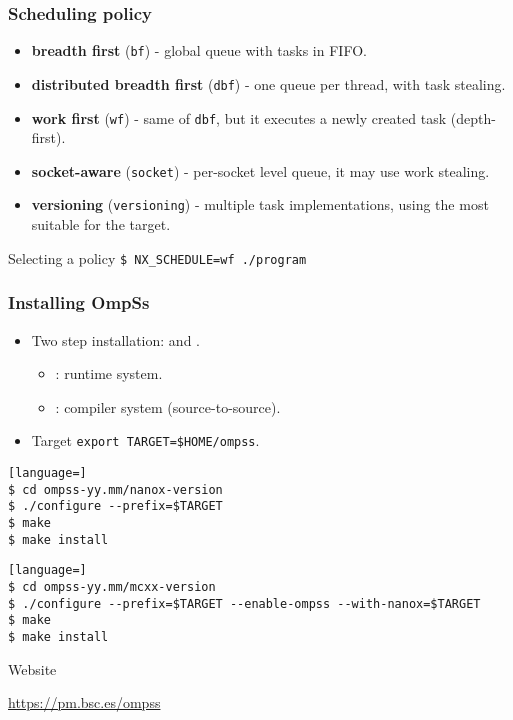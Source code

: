 \begin{frame}[fragile]
  \frametitle{Scheduling policy}
  \begin{itemize}
  \item {\bf breadth first} (\texttt{bf}) - global queue with tasks in FIFO.
  \item {\bf distributed breadth first} (\texttt{dbf}) - one queue per thread, with 
      task stealing.
  \item {\bf work first} (\texttt{wf}) - same of \texttt{dbf}, but it executes a 
    newly created task (depth-first).
  \item {\bf socket-aware} (\texttt{socket}) - per-socket level queue, it may use work stealing.
  \item {\bf versioning} (\texttt{versioning}) - multiple task implementations, using the 
    most suitable for the target.
  \end{itemize}
  \begin{exampleblock}{Selecting a policy}
  \verb+$ NX_SCHEDULE=wf ./program+
  \end{exampleblock}
\end{frame}
\begin{frame}[fragile]
  \frametitle{Installing OmpSs}
  \begin{itemize}
  \item Two step installation:  and .
    \begin{itemize}
    \item {}: runtime system.
    \item {}: compiler system (source-to-source).
    \end{itemize}
  \item Target \verb+export TARGET=$HOME/ompss+.
  \end{itemize}
  \begin{block}{}
\begin{lstlisting}[language=]
$ cd ompss-yy.mm/nanox-version
$ ./configure --prefix=$TARGET
$ make
$ make install
\end{lstlisting}
  \end{block}
  \begin{block}{}
\begin{lstlisting}[language=]
$ cd ompss-yy.mm/mcxx-version
$ ./configure --prefix=$TARGET --enable-ompss --with-nanox=$TARGET
$ make
$ make install
\end{lstlisting}
  \end{block}
  \begin{alertblock}{Website}
    \begin{center}
      \url{https://pm.bsc.es/ompss}
    \end{center}
  \end{alertblock}
\end{frame}
